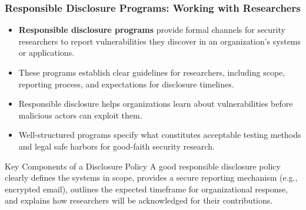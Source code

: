 \documentclass{beamer}
\begin{document}
\begin{frame}
\frametitle{Responsible Disclosure Programs: Working with Researchers}
\begin{itemize}
\item \textbf{Responsible disclosure programs} provide formal channels for security researchers to report vulnerabilities they discover in an organization's systems or applications.
\item These programs establish clear guidelines for researchers, including scope, reporting process, and expectations for disclosure timelines.
\item Responsible disclosure helps organizations learn about vulnerabilities before malicious actors can exploit them.
\item Well-structured programs specify what constitutes acceptable testing methods and legal safe harbors for good-faith security research.
\end{itemize}

\begin{exampleblock}{Key Components of a Disclosure Policy}
\scriptsize
A good responsible disclosure policy clearly defines the systems in scope, provides a secure reporting mechanism (e.g., encrypted email), outlines the expected timeframe for organizational response, and explains how researchers will be acknowledged for their contributions.
\end{exampleblock}
\end{frame}
\end{document}

